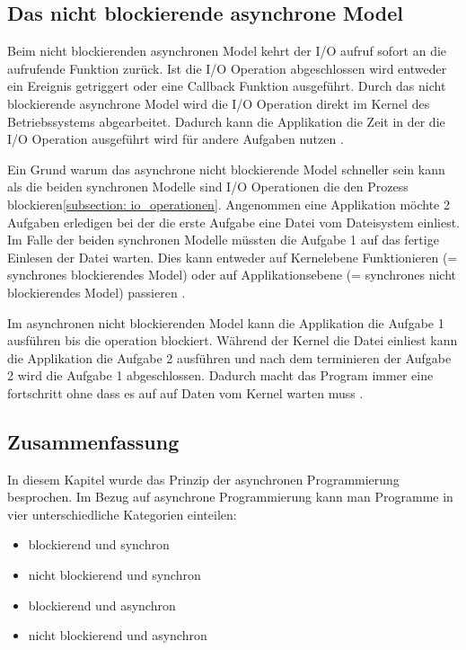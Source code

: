 \subsection{Das nicht blockierende asynchrone Model}
Beim nicht blockierenden asynchronen Model kehrt der I/O aufruf sofort an die aufrufende Funktion zurück. Ist die I/O Operation abgeschlossen wird entweder ein Ereignis getriggert oder eine Callback Funktion ausgeführt. Durch das nicht blockierende asynchrone Model wird die I/O Operation direkt im Kernel des Betriebssystems abgearbeitet. Dadurch kann die Applikation die Zeit in der die I/O Operation ausgeführt wird für andere Aufgaben nutzen \cite[p. 48]{Erb2012}.

Ein Grund warum das asynchrone nicht blockierende Model schneller sein kann als die beiden synchronen Modelle sind I/O Operationen die den Prozess blockieren\ref{subsection: io_operationen}. Angenommen eine Applikation möchte 2 Aufgaben erledigen bei der die erste Aufgabe eine Datei vom Dateisystem einliest. Im Falle der beiden synchronen Modelle müssten die Aufgabe 1 auf das fertige Einlesen der Datei warten. Dies kann entweder auf Kernelebene Funktionieren (= synchrones blockierendes Model) oder auf Applikationsebene (= synchrones nicht blockierendes Model) passieren \cite[]{Pet2015}. 

Im asynchronen nicht blockierenden Model kann die Applikation die Aufgabe 1 ausführen bis die operation blockiert. Während der Kernel die Datei einliest kann die Applikation die Aufgabe 2 ausführen und nach dem terminieren der Aufgabe 2 wird die Aufgabe 1 abgeschlossen. Dadurch macht das Program immer eine fortschritt ohne dass es auf auf Daten vom Kernel warten muss \cite[]{Pet2015}.

\subsection{Zusammenfassung}

In diesem Kapitel wurde das Prinzip der asynchronen Programmierung besprochen. Im Bezug auf asynchrone Programmierung kann man Programme in vier unterschiedliche Kategorien einteilen: 

\begin{itemize}
  \item blockierend und synchron
  \item nicht blockierend und synchron
  \item blockierend und asynchron
  \item nicht blockierend und asynchron
\end{itemize}    

